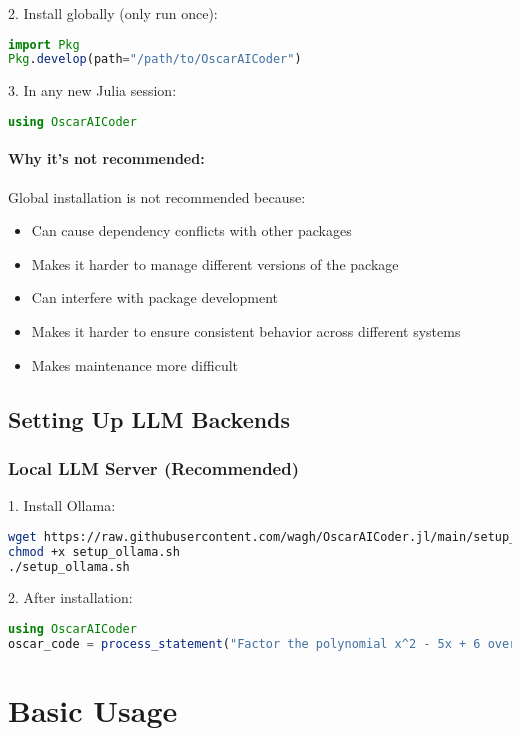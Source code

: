 \documentclass[11pt,a4paper]{article}
\begin{document}
2. Install globally (only run once):
\begin{lstlisting}[language=Julia]
import Pkg
Pkg.develop(path="/path/to/OscarAICoder")
\end{lstlisting}

3. In any new Julia session:
\begin{lstlisting}[language=Julia]
using OscarAICoder
\end{lstlisting}

\paragraph{Why it's not recommended:}
Global installation is not recommended because:
\begin{itemize}
    \item Can cause dependency conflicts with other packages
    \item Makes it harder to manage different versions of the package
    \item Can interfere with package development
    \item Makes it harder to ensure consistent behavior across different systems
    \item Makes maintenance more difficult
\end{itemize}

\subsection{Setting Up LLM Backends}

\subsubsection{Local LLM Server (Recommended)}
1. Install Ollama:
\begin{lstlisting}[language=bash]
wget https://raw.githubusercontent.com/wagh/OscarAICoder.jl/main/setup_ollama.sh
chmod +x setup_ollama.sh
./setup_ollama.sh
\end{lstlisting}

2. After installation:
\begin{lstlisting}[language=Julia]
using OscarAICoder
oscar_code = process_statement("Factor the polynomial x^2 - 5x + 6 over the integers.")
\end{lstlisting}

\section{Basic Usage}
\label{sec:basic_usage}
\end{document}
